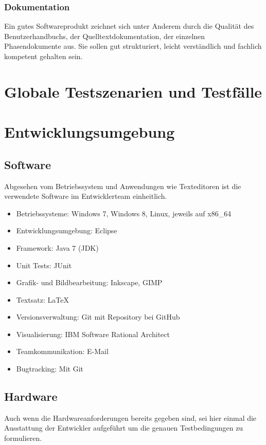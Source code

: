 \documentclass[10pt]{scrreprt}
\begin{document}
\subsection*{Dokumentation}
Ein gutes Softwareprodukt zeichnet sich unter Anderem durch die Qualität des Benutzerhandbuchs, der Quelltextdokumentation, der einzelnen Phasendokumente aus. Sie sollen gut strukturiert, leicht verständlich und fachlich kompetent gehalten sein. 




\chapter{Globale Testszenarien und Testfälle}





\chapter{Entwicklungsumgebung}
\section{Software}
Abgesehen vom Betriebssystem und Anwendungen wie Texteditoren ist die verwendete Software im Entwicklerteam einheitlich.
\begin{itemize}
\item Betriebssysteme: Windows 7, Windows 8, Linux, jeweils auf x86{\_}64
\item Entwicklungsumgebung: Eclipse
\item Framework: Java 7 (JDK)
\item Unit Tests: JUnit
\item Grafik- und Bildbearbeitung: Inkscape, GIMP
\item Textsatz: \LaTeX
\item Versionsverwaltung: Git mit Repository bei GitHub
\item Visualisierung: IBM Software Rational Architect
\item Teamkommunikation: E-Mail
\item Bugtracking: Mit Git
\end{itemize}


\section{Hardware}
Auch wenn die Hardwareanforderungen bereits gegeben sind, sei hier einmal die Ausstattung der Entwickler aufgeführt um die genauen Testbedingungen zu formulieren.
\end{document}
